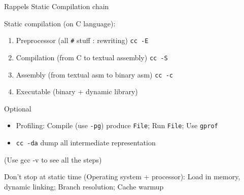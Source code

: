 \begin{Frame}{Rappels Static Compilation chain}

  \begin{block}{Static compilation (on C language):}
    
    \begin{enumerate}
    \item Preprocessor (all \texttt{\#} stuff : rewriting) \hfill \texttt{cc -E}
    \item Compilation (from C to textual assembly) \hfill \texttt{cc -S}
    \item Assembly    (from textual asm to binary asm) \hfill \texttt{cc -c}
    \item Executable  (binary + dynamic library)
    \end{enumerate}

  \end{block}
  \begin{block}{Optional}
    \begin{itemize}
    \item Profiling: Compile (use \texttt{-pg}) produce \texttt{File}; Run
      \texttt{File}; Use \texttt{gprof}
    \item \texttt{cc -da} dump all intermediate representation
    \end{itemize}
  \end{block}
    (Use gcc -v to see all the steps)
    
    Don't stop at static time (Operating system + processor): Load in
    memory, dynamic linking;  Branch resolution; Cache warmup

\end{Frame}


